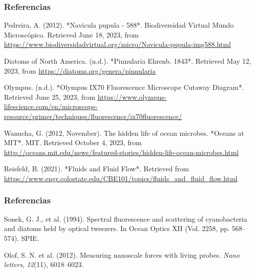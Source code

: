 \documentclass[10pt,aspectratio=1610,compress,dvipsnames]{beamer}
\begin{document}
\begin{frame}
\frametitle{Referencias}
\small



\setlength{\parskip}{6pt}

\begin{flushleft}

Pedreira, A. (2012). *Navicula pupula - 588*. Biodiversidad Virtual Mundo Microscópico. Retrieved June 18, 2023, from \url{https://www.biodiversidadvirtual.org/micro/Navicula-pupula-img588.html}


Diatoms of North America. (n.d.). *Pinnularia Ehrenb. 1843*. Retrieved May 12, 2023, from \url{https://diatoms.org/genera/pinnularia}


Olympus. (n.d.). *Olympus IX70 Fluorescence Microscope Cutaway Diagram*. Retrieved June 25, 2023, from \url{https://www.olympus-lifescience.com/en/microscope-resource/primer/techniques/fluorescence/ix70fluorescence/}


Wanucha, G. (2012, November). The hidden life of ocean microbes. *Oceans at MIT*. MIT. Retrieved October 4, 2023, from \url{http://oceans.mit.edu/news/featured-stories/hidden-life-ocean-microbes.html}


Reisfeld, B. (2021). *Fluids and Fluid Flow*. Retrieved from \url{https://www.engr.colostate.edu/CBE101/topics/fluids_and_fluid_flow.html}



\end{flushleft}
\end{frame}

\begin{frame}
\frametitle{Referencias}
\small
\setlength{\parskip}{6pt}
\begin{flushleft}
Sonek, G. J., et al. (1994). Spectral fluorescence and scattering of cyanobacteria and diatoms held by optical tweezers. In Ocean Optics XII (Vol. 2258, pp. 568--574). SPIE.


Olof, S. N. et al. (2012). Measuring nanoscale forces with living probes. \textit{Nano letters}, \textit{12}(11), 6018--6023.
\end{flushleft}
\end{frame}
\end{document}
